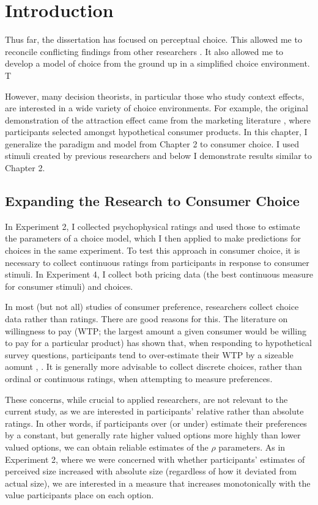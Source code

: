 \section{Introduction}
Thus far, the dissertation has focused on perceptual choice. This allowed me to reconcile conflicting findings from other researchers \parencite{spektorWhenGoodLooks2018b,trueblood2013not}. It also allowed me to develop a model of choice from the ground up in a simplified choice environment. T

However, many decision theorists, in particular those who study context effects, are interested in a wide variety of choice environments. For example, the original demonstration of the attraction effect came from the marketing literature \parencite{huberAddingAsymmetricallyDominated1982d}, where participants selected amongst hypothetical consumer products. In this chapter, I generalize the paradigm and model from Chapter 2 to consumer choice. I used stimuli created by previous researchers and below I demonstrate results similar to Chapter 2.

\subsection{Expanding the Research to Consumer Choice}

In Experiment 2, I collected psychophysical ratings and used those to estimate the parameters of a choice model, which I then applied to make predictions for choices in the same experiment. To test this approach in consumer choice, it is necessary to collect continuous ratings from participants in response to consumer stimuli. In Experiment 4, I collect both pricing data (the best continuous measure for consumer stimuli) and choices.

In most (but not all) studies of consumer preference, researchers collect choice data rather than ratings. There are good reasons for this. The literature on willingness to pay (WTP; the largest amount a given consumer would be willing to pay for a particular product) has shown that, when responding to hypothetical survey questions, participants tend to over-estimate their WTP by a sizeable aomunt \parencite{breidertREVIEWMETHODSMEASURING2006,schmidtAccuratelyMeasuringWillingness2020}, \parencite[c.f.~]{miller2011should}. It is generally more advisable to collect discrete choices, rather than ordinal or continuous ratings, when attempting to measure preferences.

These concerns, while crucial to applied researchers, are not relevant to the current study, as we are interested in participants' relative rather than absolute ratings. In other words, if participants over (or under) estimate their preferences by a constant, but generally rate higher valued options more highly than lower valued options, we can obtain reliable estimates of the $\rho$ parameters. As in Experiment 2, where we were concerned with whether participants' estimates of perceived size increased with absolute size (regardless of how it deviated from actual size), we are interested in a measure that increases monotonically with the value participants place on each option. 

